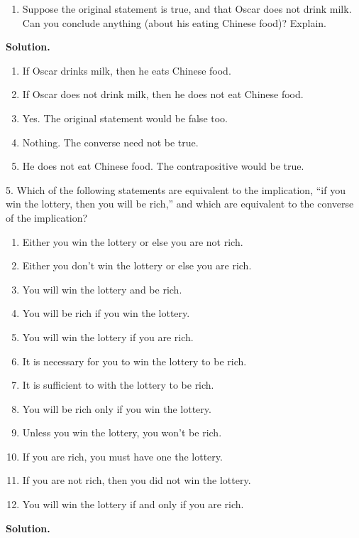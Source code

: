 \documentclass[10pt,]{book}
\theoremstyle{plain}
\theoremstyle{definition}
\theoremstyle{definition}
\theoremstyle{definition}
\numberwithin{equation}{section}
\begin{document}
\begin{exerciselist}
\begin{enumerate}[label=(\alph*)]
\item\hypertarget{li-97}{} Suppose the original statement is true, and that Oscar does not drink milk. Can you conclude anything (about his eating Chinese food)? Explain. %
\end{enumerate}
\par\smallskip
\par\smallskip
\noindent\textbf{Solution.}\hypertarget{solution-10}{}\quad
\leavevmode%
\begin{enumerate}[label=(\alph*)]
\item\hypertarget{li-98}{} If Oscar drinks milk, then he eats Chinese food. %
\item\hypertarget{li-99}{} If Oscar does not drink milk, then he does not eat Chinese food. %
\item\hypertarget{li-100}{} Yes. The original statement would be false too. %
\item\hypertarget{li-101}{} Nothing. The converse need not be true. %
\item\hypertarget{li-102}{} He does not eat Chinese food. The contrapositive would be true. %
\end{enumerate}
\item[5.]\hypertarget{exercise-5}{}
          Which of the following statements are equivalent to the implication, ``if you win the lottery, then you will be rich,'' and which are equivalent to the converse of the implication?
\leavevmode%
\begin{enumerate}[label=(\alph*)]
\item\hypertarget{li-103}{} Either you win the lottery or else you are not rich. %
\item\hypertarget{li-104}{} Either you don't win the lottery or else you are rich. %
\item\hypertarget{li-105}{} You will win the lottery and be rich. %
\item\hypertarget{li-106}{} You will be rich if you win the lottery. %
\item\hypertarget{li-107}{} You will win the lottery if you are rich. %
\item\hypertarget{li-108}{} It is necessary for you to win the lottery to be rich. %
\item\hypertarget{li-109}{} It is sufficient to with the lottery to be rich. %
\item\hypertarget{li-110}{} You will be rich only if you win the lottery. %
\item\hypertarget{li-111}{} Unless you win the lottery, you won't be rich. %
\item\hypertarget{li-112}{} If you are rich, you must have one the lottery. %
\item\hypertarget{li-113}{} If you are not rich, then you did not win the lottery. %
\item\hypertarget{li-114}{} You will win the lottery if and only if you are rich. %
\end{enumerate}
\par\smallskip
\par\smallskip
\noindent\textbf{Solution.}\hypertarget{solution-11}{}\quad


\end{exerciselist}
\end{document}
